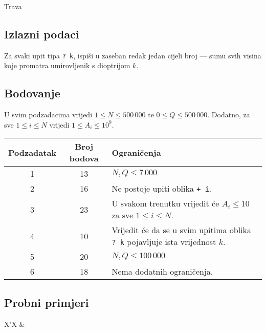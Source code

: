 \begin{statement}[
  problempoints=100,
  timelimit=1 sekunda,
  memorylimit=512 MiB,
]{Trava}
\subsection*{Izlazni podaci}

Za svaki upit tipa \texttt{\frenchspacing? k}, ispiši u zaseban redak jedan cijeli broj — sumu svih visina koje promatra umirovljenik s dioptrijom $k$.

\subsection*{Bodovanje}

U svim podzadacima vrijedi $1 \leq N \leq 500\,000$ te $0 \leq Q \leq 500\,000$. Dodatno, za sve $1 \leq i \leq N$ vrijedi $1 \leq A_i \leq 10^9$.

{\renewcommand{\arraystretch}{1.4}
  \setlength{\tabcolsep}{6pt}
  \begin{tabular}{ccl}
   Podzadatak & Broj bodova & Ograničenja \\ \midrule
   	1 & 13 & $N, Q \leq 7\,000$ \\
   	2 & 16 & Ne postoje upiti oblika \texttt{+ i}. \\
   	3 & 23 & U svakom trenutku vrijedit će $A_i \leq 10$ za sve $1 \leq i \leq N$. \\
   	4 & 10 & Vrijedit će da se u svim upitima oblika \texttt{\frenchspacing? k} pojavljuje ista vrijednost $k$. \\
   	5 & 20 & $N, Q \leq 100\,000$ \\
   	6 & 18 & Nema dodatnih ograničenja. \\ 
\end{tabular}}

\subsection*{Probni primjeri}
\begin{tabularx}{\textwidth}{X'X}
 &
\end{tabularx}

\end{statement}

